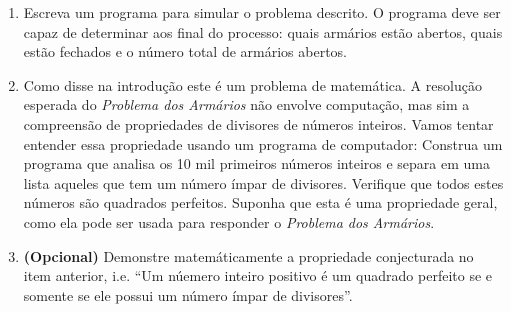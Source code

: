 \begin{enumerate}
    \begin{enumerate}
        \item Escreva um programa para simular o problema descrito. O programa deve ser capaz de determinar aos final do processo: quais armários estão abertos, quais estão fechados e o número total de armários abertos.
        \item Como disse na introdução este é um problema de matemática. A resolução esperada do {\it Problema dos Armários} não envolve computação, mas sim a compreensão de propriedades de divisores de números inteiros. Vamos tentar entender essa propriedade usando um programa de computador: Construa um programa que analisa os 10 mil primeiros números inteiros e separa em uma lista aqueles que tem um número ímpar de divisores. Verifique que todos estes números são quadrados perfeitos. Suponha que esta é uma propriedade geral, como ela pode ser usada para responder o {\it Problema dos Armários}.
        \item {\bf (Opcional)} Demonstre matemáticamente a propriedade conjecturada no item anterior, i.e.  ``Um núemero inteiro positivo é um quadrado perfeito se e somente se ele possui um número ímpar de divisores''.
    \end{enumerate}
\end{enumerate}

